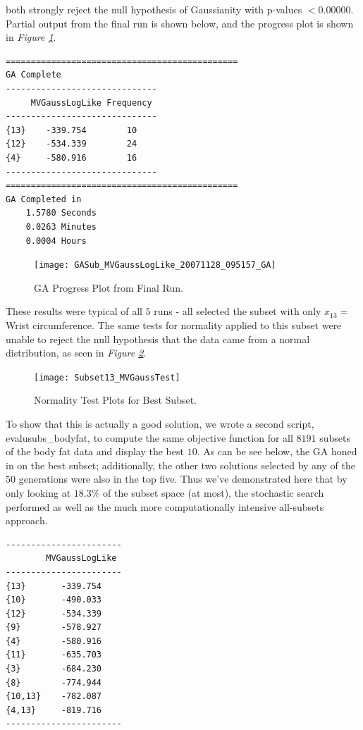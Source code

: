 \documentclass{book}
\newcommand{\textcode}[1]{\textsf{\small #1}}   %
\begin{document}
both strongly reject the null hypothesis of Gaussianity with p-values $%
<0.00000$. Partial output from the final run is shown below, and the
progress plot is shown in \emph{Figure \ref{fig_gaprogplt}}.
\begin{verbatim}
==============================================
GA Complete
------------------------------
     MVGaussLogLike Frequency
------------------------------
{13}    -339.754        10
{12}    -534.339        24
{4}     -580.916        16
------------------------------
==============================================
GA Completed in
    1.5780 Seconds
    0.0263 Minutes
    0.0004 Hours
\end{verbatim}
\begin{figure}[htbp]
\begin{center}
\texttt{[image: GASub\_MVGaussLogLike\_20071128\_095157\_GA]}
\end{center}
\caption{GA Progress Plot from Final Run.}
\label{fig_gaprogplt}
\end{figure}
These results were typical of all $5$ runs - all selected the subset with
only $x_{13}=$ Wrist circumference. The same tests for normality applied to
this subset were unable to reject the null hypothesis that the data came
from a normal distribution, as seen in \emph{Figure \ref{fig_mvnorm13}}.
\begin{figure}[htbp]
\begin{center}
\texttt{[image: Subset13\_MVGaussTest]}
\end{center}
\caption{Normality Test Plots for Best Subset.}
\label{fig_mvnorm13}
\end{figure}
To show that this is actually a good solution, we wrote a
second script, \textcode{evalusubs\_bodyfat}, to compute the
same objective function for all $8191$ subsets of the body fat
data and display the best $10$. As can be see below, the GA
honed in on the best subset; additionally, the other two
solutions selected by any of the $50$ generations were also in
the top five. Thus we've demonstrated here that by only looking
at $18.3\%$ of the subset space (at most), the stochastic
search performed as well as the much more computationally
intensive all-subsets approach.
\begin{verbatim}
-----------------------
        MVGaussLogLike
-----------------------
{13}       -339.754
{10}       -490.033
{12}       -534.339
{9}        -578.927
{4}        -580.916
{11}       -635.703
{3}        -684.230
{8}        -774.944
{10,13}    -782.087
{4,13}     -819.716
-----------------------
\end{verbatim}
\end{document}
